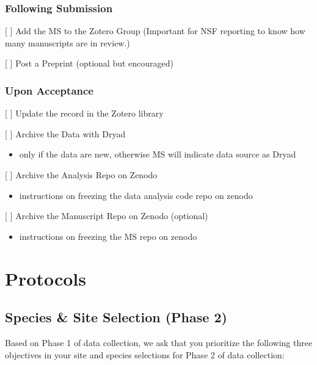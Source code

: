 \documentclass[
  letterpaper,
  DIV=11,
  numbers=noendperiod]{scrreprt}
\providecommand{\tightlist}{%
  \setlength{\itemsep}{0pt}\setlength{\parskip}{0pt}}\usepackage{longtable,booktabs,array}
\begin{document}
\section{Following Submission}\label{following-submission}

{[} {]} Add the MS to the Zotero Group (Important for NSF reporting to
know how many manuscripts are in review.)

{[} {]} Post a Preprint (optional but encouraged)

\section{Upon Acceptance}\label{upon-acceptance}

{[} {]} Update the record in the Zotero library

{[} {]} Archive the Data with Dryad

\begin{itemize}
\tightlist
\item
  only if the data are new, otherwise MS will indicate data source as
  Dryad
\end{itemize}

{[} {]} Archive the Analysis Repo on Zenodo

\begin{itemize}
\tightlist
\item
  instructions on freezing the data analysis code repo on zenodo
\end{itemize}

{[} {]} Archive the Manuscript Repo on Zenodo (optional)

\begin{itemize}
\tightlist
\item
  instructions on freezing the MS repo on zenodo
\end{itemize}

\part{Protocols}

\chapter{Species \& Site Selection (Phase 2)}\label{sec-species_site}

Based on Phase 1 of data collection, we ask that you prioritize the
following three objectives in your site and species selections for Phase
2 of data collection:
\end{document}
